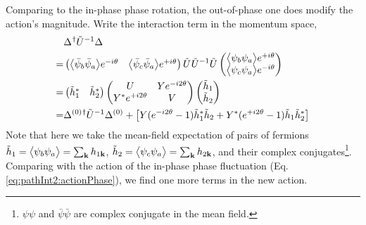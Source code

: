 Comparing to the in-phase phase rotation, the out-of-phase one does modify the action's magnitude. Write the interaction term in the momentum space,
\begin{align*}
&\Delta^{}{}^{\dagger}\tilde{U}^{-1}\Delta^{}\\
=&\begin{pmatrix}\bigl<{\bar{\psi}_{b}\bar{\psi}_{a}}\bigr>e^{-i\theta}&\bigl<{\bar{\psi}_{c}\bar{\psi}_{a}}\bigr>e^{+i\theta}\end{pmatrix}\tilde{U}^{}\tilde{U}^{-1}\tilde{U}
\begin{pmatrix}\bigl<{\psi_{b}\psi_{a}}\bigr>e^{+i\theta}\\\bigl<{\psi_{c}\psi_{a}}\bigr>e^{-i\theta}\end{pmatrix}\\
=&\begin{pmatrix}\tilde{h}_{1}^{*}&\tilde{h}_{2}^{*}\end{pmatrix}\begin{pmatrix}U&Ye^{-i2\theta}\\Y^{*}e^{+i2\theta}&V\end{pmatrix}\begin{pmatrix}\tilde{h}_{1}\\\tilde{h}_{2}\end{pmatrix}\\
=&\Delta^{(0)}{}^{\dagger}\tilde{U}^{-1}\Delta^{(0)}
+\left[Y(e^{-i2\theta}-1)\tilde{h}_{1}^{*}\tilde{h}_{2} +Y^{*}(e^{+i2\theta}-1)\tilde{h}_{1}\tilde{h}_{2}^{*}\right]
\end{align*}
Note that here we take the mean-field expectation of pairs of fermions $\tilde{h}_{1}=\bigl<{\psi_{b}\psi_{a}}\bigr>=\sum_{\mathbf{k}}h_{1\mathbf{k}}$, $\tilde{h}_{2}=\bigl<{\psi_{c}\psi_{a}}\bigr>=\sum_{\mathbf{k}}h_{2\mathbf{k}}$, and their complex conjugates\footnote{$\psi\psi$ and $\bar\psi\bar\psi$ are complex conjugate in the mean field.}.  Comparing with the action of the in-phase phase fluctuation (Eq. \ref{eq:pathInt2:actionPhase}), we find one more terms in the new action.  
